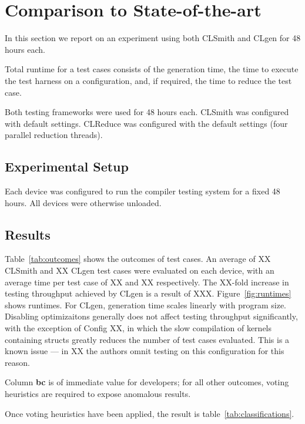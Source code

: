 \section{Comparison to State-of-the-art}\label{sec:vs_clsmith}

In this section we report on an experiment using both CLSmith and CLgen for 48 hours each.

Total runtime for a test cases consists of the generation time, the time to execute the test harness on a configuration, and, if required, the time to reduce the test case.

Both testing frameworks were used for 48 hours each. CLSmith was configured with default settings. CLReduce was configured with the default settings (four parallel reduction threads).

\subsection{Experimental Setup}

Each device was configured to run the compiler testing system for a fixed 48 hours. All devices were otherwise unloaded.

\subsection{Results}

Table~\ref{tab:outcomes} shows the outcomes of test cases. An average of XX CLSmith and XX CLgen test cases were evaluated on each device, with an average time per test case of XX and XX respectively. The XX-fold increase in testing throughput achieved by CLgen is a result of XXX. Figure~\ref{fig:runtimes} shows runtimes. For CLgen, generation time scales linearly with program size. Disabling optimizaitons generally does not affect testing throughput significantly, with the exception of Config XX, in which the slow compilation of kernels containing structs greatly reduces the number of test cases evaluated. This is a known issue --- in XX the authors omnit testing on this configuration for this reason.

Column \textbf{bc} is of immediate value for developers; for all other outcomes, voting heuristics are required to expose anomalous results.

Once voting heuristics have been applied, the result is table~\ref{tab:classifications}.

